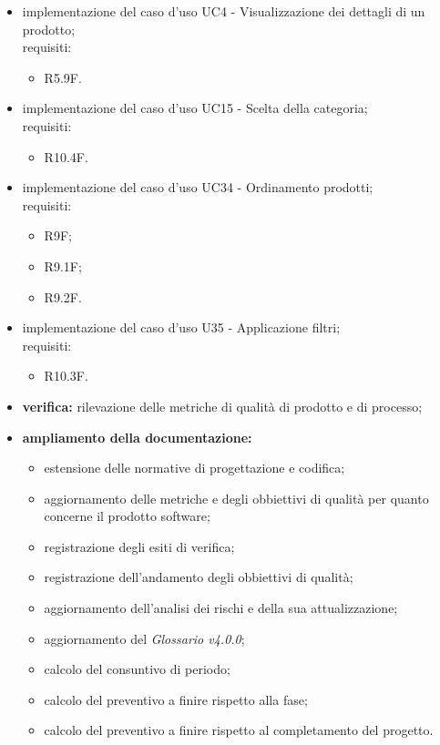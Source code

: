 \begin{itemize}
    \item implementazione del caso d'uso UC4 - Visualizzazione dei dettagli di un prodotto;\\requisiti:
          \begin{itemize}
              \item R5.9F.
          \end{itemize}
    \item implementazione del caso d'uso UC15 - Scelta della categoria;\\requisiti:
          \begin{itemize}
              \item R10.4F.
          \end{itemize}
    \item implementazione del caso d'uso UC34 - Ordinamento prodotti;\\requisiti:
          \begin{itemize}
              \item R9F;
              \item R9.1F;
              \item R9.2F.
          \end{itemize}
    \item implementazione del caso d'uso U35 - Applicazione filtri;\\requisiti:
          \begin{itemize}
              \item R10.3F.
          \end{itemize}
    \item \textbf{verifica:} rilevazione delle metriche di qualità di prodotto e di processo;
    \item \textbf{ampliamento della documentazione:}
          \begin{itemize}
              \item estensione delle normative di progettazione e codifica;
              \item aggiornamento delle metriche e degli obbiettivi di qualità per quanto concerne il prodotto software;
              \item registrazione degli esiti di verifica;
              \item registrazione dell'andamento degli obbiettivi di qualità;
              \item aggiornamento dell'analisi dei rischi e della sua attualizzazione;
              \item aggiornamento del \textit{Glossario v4.0.0};
              \item calcolo del consuntivo di periodo;
              \item calcolo del preventivo a finire rispetto alla fase;
              \item calcolo del preventivo a finire rispetto al completamento del progetto.
          \end{itemize}
\end{itemize}

